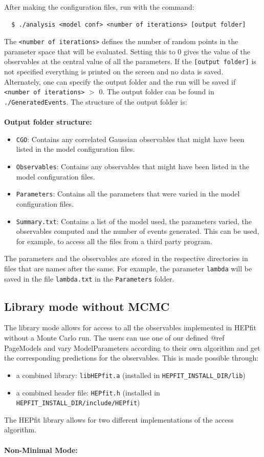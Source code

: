 \documentclass[preprint,3p,12pt]{elsarticle}
\begin{document}
After making the configuration files, run with the command:
\begin{lstlisting}
  $ ./analysis <model conf> <number of iterations> [output folder]
\end{lstlisting}

The \texttt{<number of iterations>} defines the number of random points in the parameter space that will be evaluated. Setting this to 0 gives the value of the observables at the central value of all the parameters. If the \texttt{[output folder]} is not specified everything is printed on the screen and no data is saved. Alternately, one can specify the output folder and the run will be saved if \texttt{<number of iterations>} $>$ 0. The output folder can be found in \texttt{./GeneratedEvents}. The structure of the output folder is:\\\\
%
{\bf Output folder structure:}
\begin{itemize}
\item \texttt{CGO}: Contains any correlated Gaussian observables that might have been listed in the model configuration files.
\item \texttt{Observables}: Contains any observables that might have been listed in the model configuration files.
\item \texttt{Parameters}: Contains all the parameters that were varied in the model configuration files.
\item \texttt{Summary.txt}: Contains a list of the model used, the parameters varied, the observables computed and the number of events generated. This can be used, for example, to access all the files from a third party program.
\end{itemize}
The parameters and the observables are stored in the respective directories in files that are names after the same. For example, the parameter \texttt{lambda} will be saved in the file \texttt{lambda.txt} in the \texttt{Parameters} folder.


%
\subsection{Library mode without MCMC}
\label{sec:MC}
The library mode allows for access to all the observables implemented in HEPfit
without a Monte Carlo run. The users can use one of our defined @ref PageModels and vary ModelParameters
according to their own algorithm and get the corresponding predictions for the observables. This is made possible through:
\begin{itemize}
\item a combined library: \texttt{libHEPfit.a} (installed in \texttt{HEPFIT\_INSTALL\_DIR/lib})
\item a combined header file: \texttt{HEPfit.h} (installed in \texttt{HEPFIT\_INSTALL\_DIR/include/HEPfit})
\end{itemize}
The HEPfit library allows for two different implementations of the access algorithm.\\\\
%
{\bf Non-Minimal Mode:}
\end{document}
